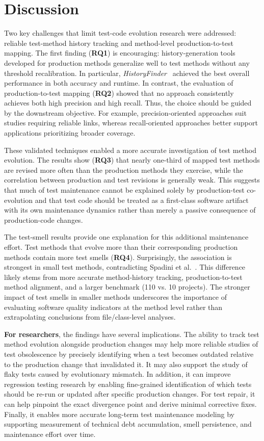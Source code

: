 \section{Discussion}

Two key challenges that limit test-code evolution research were addressed: reliable test-method history tracking and method-level production-to-test mapping. The first finding (\textbf{RQ1}) is encouraging: history-generation tools developed for production methods generalize well to test methods without any threshold recalibration. In particular, \emph{HistoryFinder}~\cite{islam_historyfinder_2025} achieved the best overall performance in both accuracy and runtime. In contrast, the evaluation of production-to-test mapping (\textbf{RQ2}) showed that no approach consistently achieves both high precision and high recall. Thus, the choice should be guided by the downstream objective. For example, precision-oriented approaches suit studies requiring reliable links, whereas recall-oriented approaches better support applications prioritizing broader coverage.

These validated techniques enabled a more accurate investigation of test method evolution. The results show (\textbf{RQ3}) that nearly one-third of mapped test methods are revised more often than the production methods they exercise, while the correlation between production and test revisions is generally weak. This suggests that much of test maintenance cannot be explained solely by production-test co-evolution and that test code should be treated as a first-class software artifact with its own maintenance dynamics rather than merely a passive consequence of production-code changes.

The test-smell results provide one explanation for this additional maintenance effort. Test methods that evolve more than their corresponding production methods contain more test smells (\textbf{RQ4}). Surprisingly, the association is strongest in small test methods, contradicting Spadini et al.~\cite{Spadini:2018}. This difference likely stems from more accurate method-history tracking, production-to-test method alignment, and a larger benchmark (110 vs. 10 projects). The stronger impact of test smells in smaller methods underscores the importance of evaluating software quality indicators at the method level rather than extrapolating conclusions from file/class-level analyses.

\textbf{For researchers}, the findings have several implications. The ability to track test method evolution alongside production changes may help more reliable studies of test obsolescence by precisely identifying when a test becomes outdated relative to the production change that invalidated it. It may also support the study of flaky tests caused by evolutionary mismatch. In addition, it can improve regression testing research by enabling fine-grained identification of which tests should be re-run or updated after specific production changes. For test repair, it can help pinpoint the exact divergence point and derive minimal corrective fixes. Finally, it enables more accurate long-term test maintenance modeling by supporting measurement of technical debt accumulation, smell persistence, and maintenance effort over time.

